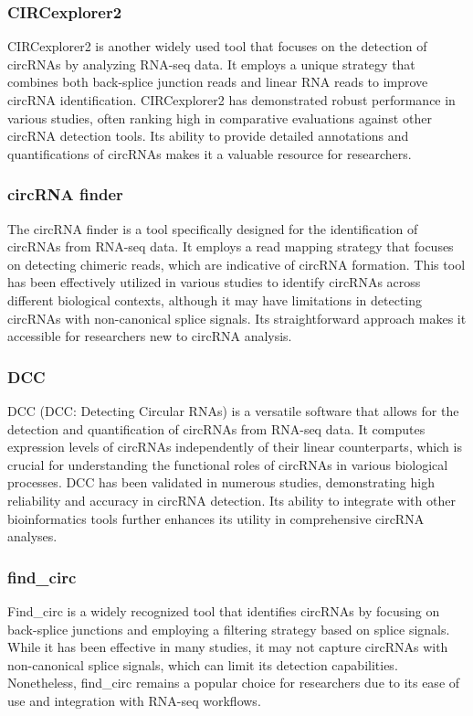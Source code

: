 \subsubsection{CIRCexplorer2}
CIRCexplorer2 is another widely used tool that focuses on the detection of
circRNAs by analyzing RNA-seq data.
It employs a unique strategy that combines both back-splice junction reads and
linear RNA reads to improve circRNA identification.
CIRCexplorer2 has demonstrated robust performance in various studies, often
ranking high in comparative evaluations against other circRNA detection
tools\supercite{zeng_comprehensive_2017,nicolet_circular_2018}.
Its ability to provide detailed annotations and quantifications of circRNAs
makes it a valuable resource for researchers\supercite{hansen_comparison_2016}.

\subsubsection{circRNA finder}
The circRNA finder is a tool specifically designed for the identification of
circRNAs from RNA-seq data.
It employs a read mapping strategy that focuses on detecting chimeric reads,
which are indicative of circRNA formation.
This tool has been effectively utilized in various studies to identify circRNAs
across different biological contexts, although it may have limitations in
detecting circRNAs with non-canonical splice
signals\supercite{sekar_circular_2018,liu_prkra_2022}.
Its straightforward approach makes it accessible for researchers new to circRNA
analysis.

\subsubsection{DCC}
DCC (DCC: Detecting Circular RNAs) is a versatile software that allows for the
detection and quantification of circRNAs from RNA-seq data.
It computes expression levels of circRNAs independently of their linear
counterparts, which is crucial for understanding the functional roles of
circRNAs in various biological
processes\supercite{jakobi_profiling_2016,man_profiling_2020}.
DCC has been validated in numerous studies, demonstrating high reliability and
accuracy in circRNA detection\supercite{paraboschi_interpreting_2018}.
Its ability to integrate with other bioinformatics tools further enhances its
utility in comprehensive circRNA analyses.

\subsubsection{find\_circ}
Find\_circ is a widely recognized tool that identifies circRNAs by focusing on
back-splice junctions and employing a filtering strategy based on splice
signals.
While it has been effective in many studies, it may not capture circRNAs with
non-canonical splice signals, which can limit its detection
capabilities\supercite{sekar_circular_2018,liu_prkra_2022}.
Nonetheless, find\_circ remains a popular choice for researchers due to its
ease of use and integration with RNA-seq workflows.

